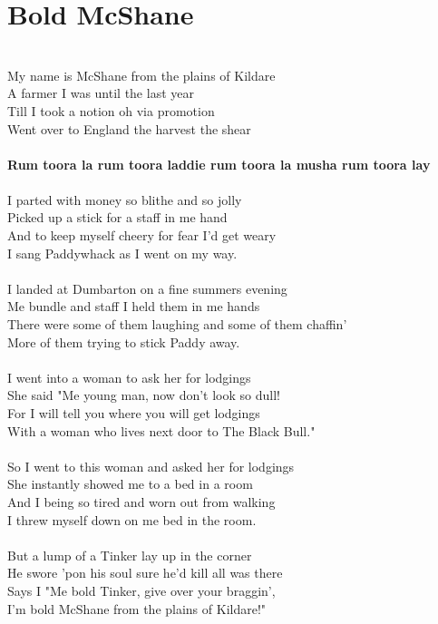 \documentclass[letterpaper,9pt]{article}
\begin{document}
\section{Bold McShane}
\large
\noindent
\\My name is McShane from the plains of Kildare
\\A farmer I was until the last year
\\Till I took a notion oh via promotion
\\Went over to England the harvest the shear
\\
\\\textbf{Rum toora la rum toora laddie rum toora la musha rum toora lay}
\\
\\I parted with money so blithe and so jolly
\\Picked up a stick for a staff in me hand
\\And to keep myself cheery for fear I'd get weary
\\I sang Paddywhack as I went on my way.
\\
\\I landed at Dumbarton on a fine summers evening
\\Me bundle and staff I held them in me hands
\\There were some of them laughing and some of them chaffin'
\\More of them trying to stick Paddy away.
\\
\\I went into a woman to ask her for lodgings
\\She said "Me young man, now don't look so dull!
\\For I will tell you where you will get lodgings
\\With a woman who lives next door to The Black Bull."
\\
\\So I went to this woman and asked her for lodgings
\\She instantly showed me to a bed in a room
\\And I being so tired and worn out from walking
\\I threw myself down on me bed in the room.
\\
\\But a lump of a Tinker lay up in the corner
\\He swore 'pon his soul sure he'd kill all was there
\\Says I "Me bold Tinker, give over your braggin',
\\I'm bold McShane from the plains of Kildare!"
\end{document}
